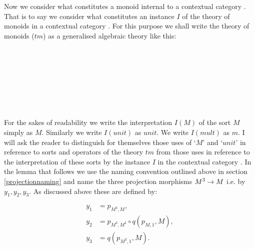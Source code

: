 
Now we consider what constitutes a monoid internal to a contextual category \catc. That is to say 
we consider what constitutes an instance $I$ of the theory of monoids   in a contextual category \catc.
For this purpose we shall write the theory of monoids ($tm$) as a generalised algebraic theory like this: 
\begin{gatrules}
\gatintros
{}
 \\
 \\
 \\
\gataxioms

\begin{gatgroup}{}
 \\
\end{gatgroup} \\
\end{gatrules}

For the sakes of readability we write the interpretation $I(M)$ of the sort $M$ simply as $M$. Similarly we write $I(unit)$ as $unit$. We write $I(mult)$ as $m$. I will ask the reader  to distinguish for themselves 
those uses of `$M$' and `$unit$' in reference to sorts and operators of the theory $tm$ from those uses in reference to the interpretation of these sorts by the instance $I$ in the contextual category \catc. 
  In the  lemma that follows we use the naming convention outlined above in section \ref{projectionnaming} and name the three projection morphisms $M^3 \rightarrow M$ i.e. by $y_1, y_2, y_3$.
As discussed above these are defined by:

\begin{align*}
y_1 &= p_{M^3,M}, \\
y_2 &= p_{M^3,M^2} \circ q(p_{M,1},M), \\
y_3 &= q(p_{M^2,1},M). \hspace{1cm}\\
\end{align*}

\newcommand{\wM}{\ofT{w}{M}}
\newcommand{\xM}{\ofT{x_1, x_2}{M}}
\newcommand{\yM}{\ofT{y_1, y_2, y_3}{M}}
\newcommand{\doubleM}{M^2}                       %
\newcommand{\trebleM}{M^3}                       %
\newcommand{\quadM}{M^4}                         %
\newcommand{\spi}{s(p_{M^3,M^i})}
\newcommand{\sptrebleone}{s(p_{M^3,M^1})}
\newcommand{\sptrebletwo}{s(p_{M^3,M^2})}
\newcommand{\sptreblethree}{s(p_{M^3,M^3})}
\newcommand{\fmult}{m}  %

